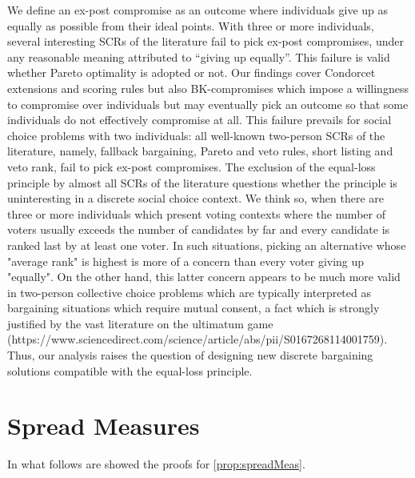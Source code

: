 \documentclass[version=3.21, pagesize, twoside=off, bibliography=totoc, DIV=calc, fontsize=12pt, a4paper]{scrartcl}
\begin{document}
We define an ex-post compromise as an outcome where individuals give up as equally as possible from their ideal points. With three or more individuals, several interesting \acp{SCR} of the literature fail to pick ex-post compromises, under any reasonable meaning attributed to “giving up equally”. This failure is valid whether Pareto optimality is adopted or not. Our findings cover Condorcet extensions and scoring rules but also BK-compromises which impose a willingness to compromise over individuals but may eventually pick an outcome so that some individuals do not effectively compromise at all. This failure prevails for social choice problems with two individuals: all well-known two-person \acp{SCR} of the literature, namely, fallback bargaining, Pareto and veto rules, short listing and veto rank, fail to pick ex-post compromises. 
The exclusion of the equal-loss principle by almost all \acp{SCR} of the literature questions whether the principle is uninteresting in a discrete social choice context. We think so, when there are three or more individuals which present voting contexts where the number of voters usually exceeds the number of candidates by far and every candidate is ranked last by at least one voter. In such situations, picking an alternative whose "average rank" is highest is more of a concern than every voter giving up "equally". On the other hand, this latter concern appears to be much more valid in two-person collective choice problems which are typically interpreted as bargaining situations which require mutual consent, a fact which is strongly justified by the vast literature on the ultimatum game (https://www.sciencedirect.com/science/article/abs/pii/S0167268114001759). Thus, our analysis raises the question of designing new discrete bargaining solutions compatible with the equal-loss principle.   



\appendix

\newcommand{\smad}{\sigma_\text{mad}}

\section{Spread Measures}
\label{apdx:proofSM}
In what follows are showed the proofs for \cref{prop:spreadMeas}.
\end{document}
